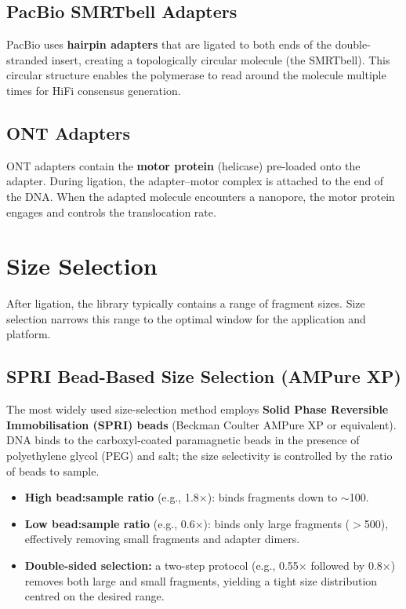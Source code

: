 \subsection{PacBio SMRTbell Adapters}

PacBio uses \textbf{hairpin adapters} that are ligated to both ends of the double-stranded insert, creating a topologically circular molecule (the SMRTbell). This circular structure enables the polymerase to read around the molecule multiple times for HiFi consensus generation.

\subsection{ONT Adapters}

ONT adapters contain the \textbf{motor protein} (helicase) pre-loaded onto the adapter. During ligation, the adapter--motor complex is attached to the end of the DNA. When the adapted molecule encounters a nanopore, the motor protein engages and controls the translocation rate.


\section{Size Selection}
\label{sec:size_selection}

After ligation, the library typically contains a range of fragment sizes. Size selection narrows this range to the optimal window for the application and platform.

\subsection{SPRI Bead-Based Size Selection (AMPure XP)}

The most widely used size-selection method employs \textbf{Solid Phase Reversible Immobilisation (SPRI) beads} (Beckman Coulter AMPure XP or equivalent). DNA binds to the carboxyl-coated paramagnetic beads in the presence of polyethylene glycol (PEG) and salt; the size selectivity is controlled by the ratio of beads to sample.

\begin{itemize}[nosep]
  \item \textbf{High bead:sample ratio} (e.g., 1.8$\times$): binds fragments down to ${\sim}$100\basepair.
  \item \textbf{Low bead:sample ratio} (e.g., 0.6$\times$): binds only large fragments ($>$500\basepair), effectively removing small fragments and adapter dimers.
  \item \textbf{Double-sided selection:} a two-step protocol (e.g., 0.55$\times$ followed by 0.8$\times$) removes both large and small fragments, yielding a tight size distribution centred on the desired range.
\end{itemize}

